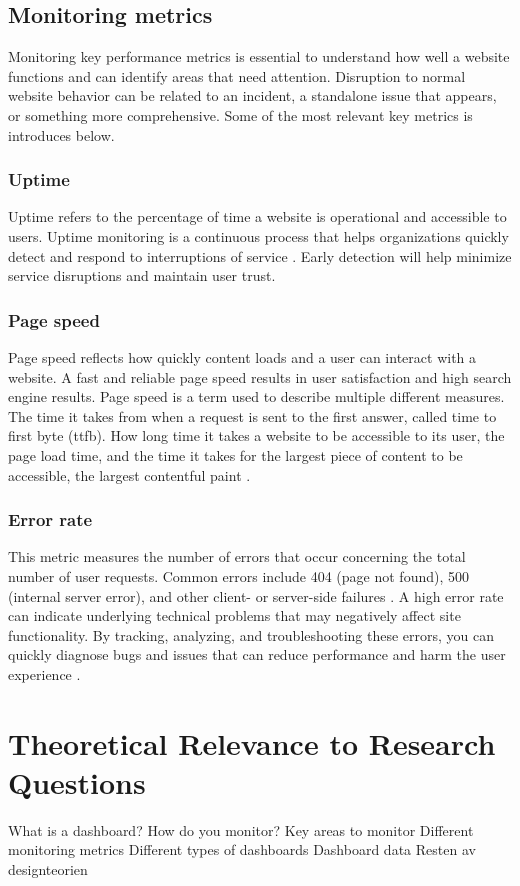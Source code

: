 \subsection{Monitoring metrics}
\label{subsec:monitoring_metrics}


Monitoring key performance metrics is essential to understand how well a website functions and can identify areas that need attention. Disruption to normal website behavior can be related to an incident, a standalone issue that appears, or something more comprehensive. Some of the most relevant key metrics is introduces below. 

\subsubsection{Uptime}
\label{subsubsec:uptime}


Uptime refers to the percentage of time a website is operational and accessible to users. Uptime monitoring is a continuous process that helps organizations quickly detect and respond to interruptions of service \autocite{IBMwebmonitor}. Early detection will help minimize service disruptions and maintain user trust. 


\subsubsection{Page speed}
\label{subsubsec:page_speed}


Page speed reflects how quickly content loads and a user can interact with a website. A fast and reliable page speed results in user satisfaction and high search engine results. Page speed is a term used to describe multiple different measures. The time it takes from when a request is sent to the first answer, called time to first byte (\acrshort{ttfb}). How long time it takes a website to be accessible to its user, the page load time, and the time it takes for the largest piece of content to be accessible, the largest contentful paint \autocite{IBMwebmonitor}.

\subsubsection{Error rate}
\label{subsubsec:error_rate}


This metric measures the number of errors that occur concerning the total number of user requests. Common errors include 404 (page not found), 500 (internal server error), and other client- or server-side failures \autocite{IBMwebmonitor}. A high error rate can indicate underlying technical problems that may negatively affect site functionality. By tracking, analyzing, and troubleshooting these errors, you can quickly diagnose bugs and issues that can reduce performance and harm the user experience \autocite{akamai}.
 


\section{Theoretical Relevance to Research Questions}
\label{sec:what_why}

What is a dashboard?
How do you monitor?
Key areas to monitor
Different monitoring metrics
Different types of dashboards
Dashboard data
Resten av designteorien